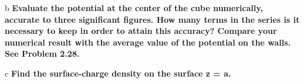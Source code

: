 \begin{homeworkProblem}

\begin{homeworkSection}{b}
\textbf{Evaluate the potential at the center of the cube numerically, accurate to three 
significant figures. How many terms in the series is it necessary to keep in 
order to attain this accuracy? Compare your numerical result with the average 
value of the potential on the walls. See Problem 2.28.}

\end{homeworkSection}

\begin{homeworkSection}{c}
\textbf{Find the surface-charge density on the surface z = a.}
\end{homeworkSection}

\end{homeworkProblem}